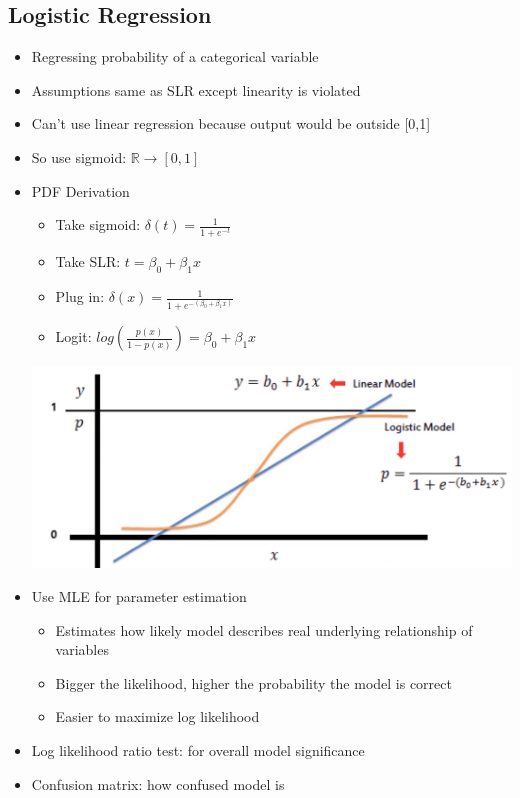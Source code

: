 \documentclass{article}
\begin{document}
\begin{multicols*}{3}
        \section{Logistic Regression}
    \renewcommand\labelitemi{{\boldmath$\cdot$}}
    \begin{itemize}[noitemsep] 
        \item Regressing probability of a categorical variable
        \item Assumptions same as SLR except linearity is violated
        \item Can't use linear regression because output would be outside [0,1]
        \item So use sigmoid: $\mathbb{R} \rightarrow [0,1]$
        \item PDF Derivation
        \begin{itemize}
            \item Take sigmoid: $\delta(t) = \frac{1}{1+e^{-t}}$
            \item Take SLR: $t = \beta_0 + \beta_1x$
            \item Plug in: $\delta(x) = \frac{1}{1+e^{-(\beta_0+\beta_1x)}}$
            \item Logit: $log(\frac{p(x)}{1-p(x)}) = \beta_0 + \beta_1x$
        \end{itemize}
        \includegraphics[width=\linewidth]{q26_logistic_regression}
        \item Use MLE for parameter estimation
        \begin{itemize}
            \item Estimates how likely model describes real underlying 
            relationship of variables
            \item Bigger the likelihood, higher the probability the model 
            is correct
            \item Easier to maximize log likelihood
        \end{itemize}
        \item Log likelihood ratio test: for overall model significance
        \item Confusion matrix: how confused model is 
    \end{itemize}



\end{multicols*}
\end{document}
